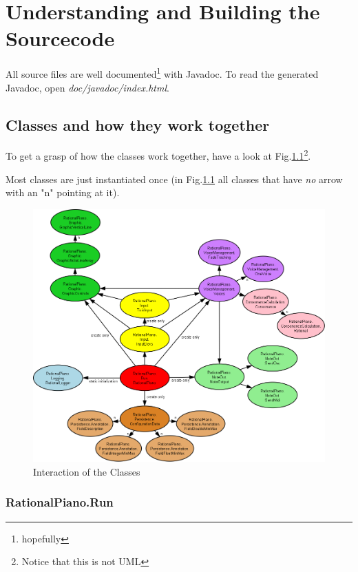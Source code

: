 \documentclass[12pt,a4paper,titlepage,oneside]{report}
\begin{document}
\chapter{Understanding and Building the Sourcecode}
\label{chap:source}

All source files are well documented\footnote{hopefully} with Javadoc. To read the generated Javadoc, open \textit{doc/javadoc/index.html}.

\section{Classes and how they work together}

To get a grasp of how the classes work together, have a look at Fig.\ref{fig:interaction}\footnote{Notice that this is not UML}.

Most classes are just instantiated once (in Fig.\ref{fig:interaction} all classes that have \emph{no} arrow with an "n" pointing at it).

\begin{figure}[!ht]
\includegraphics[width=\textwidth]{images/control_interaction.png}
\centering
\caption{Interaction of the Classes}
\label{fig:interaction}
\end{figure}


\subsection{RationalPiano.Run}
\label{sec:Run}
\end{document}
